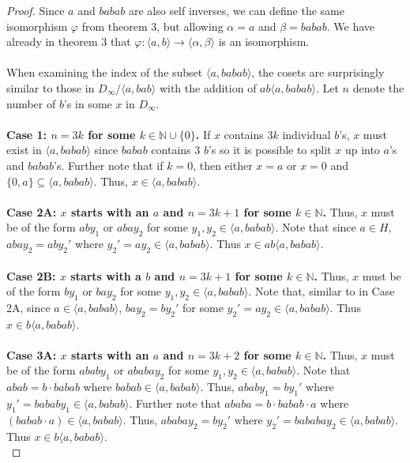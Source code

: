 \documentclass{article}
\theoremstyle{definition}
\begin{document}
\begin{proof}
    Since $a$ and $babab$ are also self inverses, we can define the same isomorphism $\varphi$ from theorem 3, but allowing $\alpha=a$ and $\beta=babab$. We have already in theorem 3 that $\varphi:\langle a,b\rangle \rightarrow \langle \alpha,\beta\rangle$ is an isomorphism.\\
    \\
    When examining the index of the subset $\langle a,babab\rangle$, the cosets are surprisingly similar to those in $D_\infty/\langle a,bab\rangle$ with the addition of $ab\langle a,babab\rangle$. Let $n$ denote the number of $b$'s in some $x$ in $D_\infty$.\\
    \\
\textbf{Case 1: $n=3k$ for some $k\in\mathbb{N}\cup \{0\}$.} If $x$ contains $3k$ individual $b$'s, $x$ must exist in $\langle a,babab\rangle$ since $babab$ contains $3$ $b$'s so it is possible to split $x$ up into $a$'s and $babab$'s. Further note that if $k=0$, then either $x=a$ or $x=0$ and $\{0,a\}\subseteq \langle a,babab\rangle$. Thus, $x\in \langle a,babab\rangle$.\\
\\
\textbf{Case 2A: $x$ starts with an $a$ and $n=3k+1$ for some $k\in\mathbb{N}$.} Thus, $x$ must be of the form $aby_1$ or $abay_2$ for some $y_1,y_2\in \langle a,babab\rangle$. Note that since $a\in H$, $abay_2=aby_2'$ where $y_2'=ay_2\in \langle a,babab\rangle$. Thus $x\in ab\langle a,babab\rangle$.\\
\\
\textbf{Case 2B: $x$ starts with a $b$ and $n=3k+1$ for some $k\in\mathbb{N}$.} Thus, $x$ must be of the form $by_1$ or $bay_2$ for some $y_1,y_2\in \langle a,babab\rangle$. Note that, similar to in Case 2A, since $a\in \langle a,babab\rangle$, $bay_2=by_2'$ for some $y_2'=ay_2\in \langle a,babab\rangle$. Thus $x\in b\langle a,babab\rangle$.\\
\\
\textbf{Case 3A: $x$ starts with an $a$ and $n=3k+2$ for some $k\in\mathbb{N}$.} Thus, $x$ must be of the form $ababy_1$ or $ababay_2$ for some $y_1,y_2\in \langle a,babab\rangle$. Note that $abab=b\cdot babab$ where $babab\in \langle a,babab\rangle$. Thus, $ababy_1=by_1'$ where $y_1'=bababy_1\in \langle a,babab\rangle$. Further note that $ababa=b\cdot babab\cdot a$ where $(babab\cdot a)\in \langle a,babab\rangle$. Thus, $ababay_2=b y_2'$ where $y_2'=bababay_2\in \langle a,babab\rangle$. Thus $x\in b\langle a,babab\rangle$.\\

\end{proof}
\end{document}
